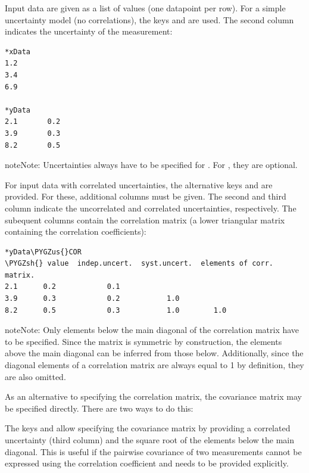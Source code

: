 \documentclass[a4paper,10pt,english]{sphinxmanual}
\def\PYGZus{\char`\_}
\def\PYGZsh{\char`\#}
\begin{document}
\begin{fulllineitems}
Input data are given as a list of values (one datapoint per row). For a
simple uncertainty model (no correlations), the keys  and
 are used. The second column indicates the uncertainty of the
measurement:

\begin{Verbatim}[commandchars=\\\{\}]
*xData
1.2
3.4
6.9

*yData
2.1       0.2
3.9       0.3
8.2       0.5
\end{Verbatim}

\begin{notice}{note}{Note:}
Uncertainties always have to be specified for . For
, they are optional.
\end{notice}

For input data with correlated uncertainties, the alternative keys
 and  are provided. For these, additional
columns must be given. The second and third column indicate the
uncorrelated and correlated uncertainties, respectively. The subequent
columns contain the correlation matrix (a lower triangular matrix
containing the correlation coefficients):

\begin{Verbatim}[commandchars=\\\{\}]
*yData\PYGZus{}COR
\PYGZsh{} value  indep.uncert.  syst.uncert.  elements of corr. matrix.
2.1      0.2            0.1
3.9      0.3            0.2           1.0
8.2      0.5            0.3           1.0        1.0
\end{Verbatim}

\begin{notice}{note}{Note:}
Only elements below the main diagonal of the correlation matrix have
to be specified. Since the matrix is symmetric by construction, the
elements above the main diagonal can be inferred from those below.
Additionally, since the diagonal elements of a correlation matrix are
always equal to 1 by definition, they are also omitted.
\end{notice}

As an alternative to specifying the correlation matrix, the covariance
matrix may be specified directly. There are two ways to do this:

The keys  and  allow specifying the
covariance matrix by providing a correlated uncertainty (third column)
and the square root of the elements below the main diagonal. This is
useful if the pairwise covariance of two measurements cannot be
expressed using the correlation coefficient and needs to be provided
explicitly.


\end{fulllineitems}
\end{document}
